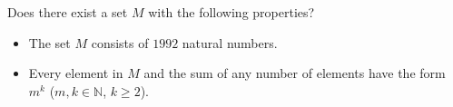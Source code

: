 Does there exist a set $M$ with the following properties?
\begin{itemize}
\item[(i)] The set $M$ consists of $1992$ natural numbers.
\item[(ii)] Every element in $M$ and the sum of any number of elements have the form $m^k$ ($m, k \in \mathbb{N}$, $k \geq 2$).
\end{itemize}
